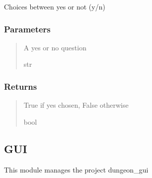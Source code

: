 \documentclass[letterpaper,10pt,english]{sphinxmanual}
\begin{document}
\begin{fulllineitems}
\label{\detokenize{api_reference/dungeon_resolver/generate_dungeon_problem:generate_dungeon_problem.yes_or_no}}
\pysigstartsignatures
{}
\pysigstopsignatures
\sphinxAtStartPar
Choices between yes or not (y/n)


\subsubsection{Parameters}
\label{\detokenize{api_reference/dungeon_resolver/generate_dungeon_problem:id16}}\begin{quote}\begin{description}
\sphinxAtStartPar
A yes or no question

\sphinxAtStartPar
str

\end{description}\end{quote}


\subsubsection{Returns}
\label{\detokenize{api_reference/dungeon_resolver/generate_dungeon_problem:id17}}\begin{quote}\begin{description}
\sphinxAtStartPar
True if yes chosen, False otherwise

\sphinxAtStartPar
bool

\end{description}\end{quote}

\end{fulllineitems}


\sphinxstepscope


\subsection{GUI}
\label{\detokenize{api_reference/dungeon_resolver/GUI:module-GUI}}\label{\detokenize{api_reference/dungeon_resolver/GUI:gui}}\label{\detokenize{api_reference/dungeon_resolver/GUI::doc}}
\sphinxAtStartPar
This module manages the project dungeon\_gui
\end{document}
